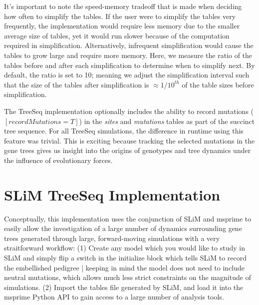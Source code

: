 \documentclass{article}
\begin{document}
It's important to note the speed-memory tradeoff that is made when deciding how often to simplify the tables.
If the user were to simplify the tables very frequently, the implementation would require less memory due to the smaller average size of tables,
yet it would run slower because of the computation required in simplification.
Alternatively, infrequent simplification would cause the tables to grow large and require more memory. 
Here, we measure the ratio of the tables before and after each simplification to determine when to simplify next.
By default, the ratio is set to 10; meaning we adjust the simplification interval such that the size of the tables 
after simplification is $\approx 1/10^{th}$ of the table sizes before simplification.

The TreeSeq implementation optionally includes the ability to record mutations ($[recordMutations = T]$) in the 
\textit{sites} and \textit{mutations} tables as part of the succinct tree sequence.
For all TreeSeq simulations, the difference in runtime using this feature was trivial.
This is exciting because tracking the selected mutations in the gene trees gives us
insight into the origins of genotypes and tree dynamics under the influence of evolutionary forces.

\section{SLiM TreeSeq Implementation}

Conceptually, this implementation uses the conjunction of SLiM and msprime  
to easily allow the investigation of a large number of dynamics surrounding gene trees generated through large,
forward-moving simulations with a very straitforward workflow:
(1) Create any model which you would like to study in 
SLiM and simply flip a switch in the initialize block which tells SLiM to record the embellished pedigree |
keeping in mind the model does not need to include neutral mutations, 
which allows much less strict constraints on the magnitude of simulations.
(2) Import the tables file generated by SLiM, and load it into the msprime Python API 
to gain access to a large number of analysis tools.
\end{document}
